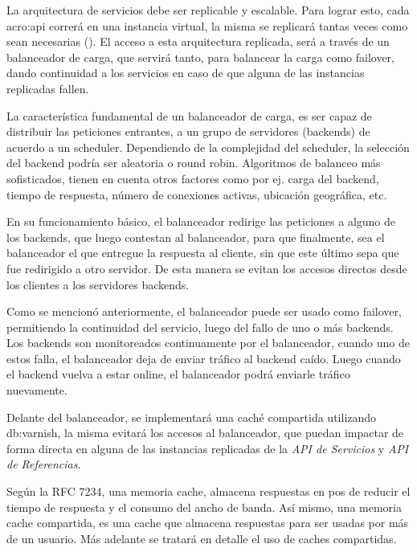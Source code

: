 La arquitectura de servicios debe ser replicable y escalable.  Para lograr esto, cada \gls{acro:api} correrá en una instancia virtual, la misma se replicará tantas veces como sean necesarias ().  El acceso a esta arquitectura replicada, será a través de un balanceador de carga, que servirá tanto, para balancear la carga como failover, dando continuidad a los servicios en caso de que alguna de las instancias replicadas fallen.

La característica fundamental de un balanceador de carga, es ser capaz de distribuir las peticiones entrantes, a un grupo de servidores (backends) de acuerdo a un scheduler.  Dependiendo de la complejidad del scheduler, la selección del backend podría ser aleatoria o round robin.  Algoritmos de balanceo más sofisticados, tienen en cuenta otros factores como por ej. carga del backend, tiempo de respuesta, número de conexiones activas, ubicación geográfica, etc.

En su funcionamiento básico, el balanceador redirige las peticiones a alguno de los backends, que luego contestan al balanceador, para que finalmente, sea el balanceador el que entregue la respuesta al cliente, sin que este último sepa que fue redirigido a otro servidor.  De esta manera se evitan los accesos directos desde los clientes a los servidores backends.

Como se mencionó anteriormente, el balanceador puede ser usado como failover, permitiendo la continuidad del servicio, luego del fallo de uno o más backends.  Los backends son monitoreados continuamente por el balanceador, cuando uno de estos falla, el balanceador deja de enviar tráfico al backend caído.  Luego cuando el backend vuelva a estar online, el balanceador podrá enviarle tráfico nuevamente.

Delante del balanceador, se implementará una caché compartida utilizando \gls{db:varnish}, la misma evitará los accesos al balanceador, que puedan impactar de forma directa en alguna de las instancias replicadas de la \textit{API de Servicios} y \textit{API de Referencias}.

Según la RFC 7234, una memoria cache, almacena respuestas en pos de reducir el tiempo de respuesta y el consumo del ancho de banda. Así mismo, una memoria cache compartida, es una cache que almacena respuestas para ser usadas por más de un usuario. Más adelante se tratará en detalle el uso de caches compartidas.

